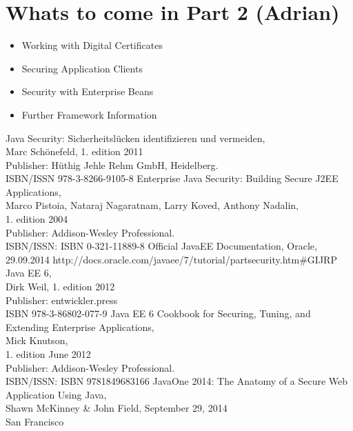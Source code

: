 \documentclass[12pt,a4paper]{report}
\begin{document}
\section{Whats to come in Part 2 (Adrian)}
\begin{itemize}
	\item Working with Digital Certificates\\
	\item Securing Application Clients\\
	\item Security with Enterprise Beans\\
	\item Further Framework Information\\
\end{itemize}


\newpage
\begin{thebibliography}{99}
Java Security: Sicherheitslücken identifizieren und vermeiden, \\
Marc Schönefeld, 1. edition 2011\\
Publisher: Hüthig Jehle Rehm GmbH, Heidelberg. \\
ISBN/ISSN 978-3-8266-9105-8
Enterprise Java Security: Building Secure J2EE Applications,\\
Marco Pistoia, Nataraj Nagaratnam, Larry Koved, Anthony Nadalin,\\
1. edition 2004 \\
Publisher: Addison-Wesley Professional.\\
ISBN/ISSN: ISBN 0-321-11889-8
Official JavaEE Documentation, Oracle,\\
29.09.2014
http://docs.oracle.com/javaee/7/tutorial/partsecurity.htm\#GIJRP
Java EE 6,\\
Dirk Weil, 1. edition 2012\\
Publisher: entwickler.press\\
ISBN 978-3-86802-077-9
Java EE 6 Cookbook for Securing, Tuning, and Extending Enterprise Applications,\\
Mick Knutson,\\
1. edition June 2012 \\
Publisher: Addison-Wesley Professional.\\
ISBN/ISSN: ISBN 9781849683166
JavaOne 2014: The Anatomy of a Secure Web Application Using Java, \\
Shawn McKinney \& John Field, September 29, 2014\\
San Francisco
\end{thebibliography}
\end{document}
